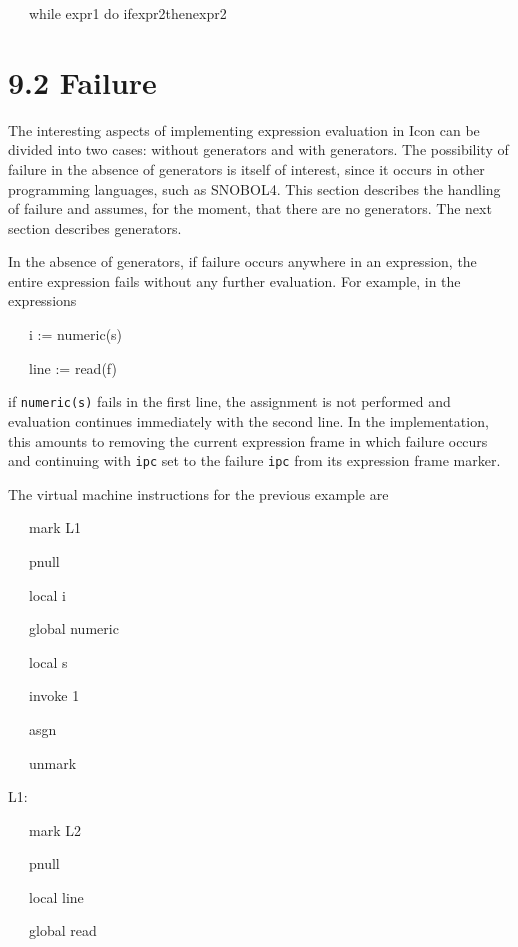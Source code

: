 {\ttfamily\mdseries
\ \ \ while expr1 do ifexpr2thenexpr2}


\section[9.2 Failure]{9.2 Failure}

The interesting aspects of implementing expression evaluation in Icon
can be divided into two cases: without generators and with
generators. The possibility of failure in the absence of generators is
itself of interest, since it occurs in other programming languages,
such as SNOBOL4. This section describes the handling of failure and
assumes, for the moment, that there are no generators. The next
section describes generators.

In the absence of generators, if failure occurs anywhere in an
expression, the entire expression fails without any further
evaluation. For example, in the expressions

{\ttfamily\mdseries
\ \ \ i := numeric(s)}

{\ttfamily\mdseries
\ \ \ line := read(f)}

\noindent if \texttt{numeric(s)} fails in the first line, the
assignment is not performed and evaluation continues immediately with
the second line. In the implementation, this amounts to removing the
current expression frame in which failure occurs and continuing with
\texttt{ipc} set to the failure \texttt{ipc} from its expression frame
marker.

The virtual machine instructions for the previous example are

{\ttfamily\mdseries
\ \ \ mark L1}

{\ttfamily\mdseries
\ \ \ pnull}

{\ttfamily\mdseries
\ \ \ local i}

{\ttfamily\mdseries
\ \ \ global numeric}

{\ttfamily\mdseries
\ \ \ local s}

{\ttfamily\mdseries
\ \ \ invoke 1}

{\ttfamily\mdseries
\ \ \ asgn}

{\ttfamily\mdseries
\ \ \ unmark}

{\ttfamily\mdseries
L1:}

{\ttfamily\mdseries
\ \ \ mark L2}

{\ttfamily\mdseries
\ \ \ pnull}

{\ttfamily\mdseries
\ \ \ local line}

{\ttfamily\mdseries
\ \ \ global read}

